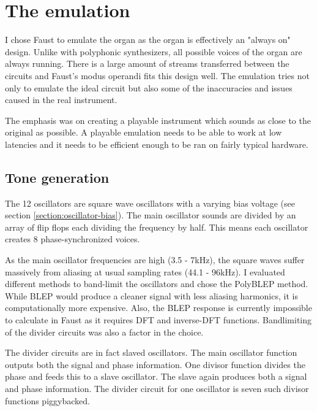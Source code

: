 \documentclass[11pt,a4paper]{article}
\begin{document}
\section{The emulation} 

I chose Faust to emulate the organ as the organ is effectively an "always on" design. Unlike with polyphonic synthesizers, all possible voices of the organ are always running. There is a large amount of streams transferred between the circuits and Faust's modus operandi fits this design well. The emulation tries not only to emulate the ideal circuit but also some of the inaccuracies and issues caused in the real instrument. 

The emphasis was on creating a playable instrument which sounds as close to the original as possible. A playable emulation needs to be able to work at low latencies and it needs to be efficient enough to be ran on fairly typical hardware.

\subsection{Tone generation}

The 12 oscillators are square wave oscillators with a varying bias voltage (see section \ref{section:oscillator-bias}). The main oscillator sounds are divided by an array of flip flops each dividing the frequency by half. This means each oscillator creates 8 phase-synchronized voices.

As the main oscillator frequencies are high (3.5 - 7kHz), the square waves suffer massively from aliasing at usual sampling rates (44.1 - 96kHz). I evaluated different methods to band-limit the oscillators and chose the PolyBLEP\cite{antialiasing} method. While BLEP would produce a cleaner signal with less aliasing harmonics, it is computationally more expensive. Also, the BLEP response is currently impossible to calculate in Faust as it requires DFT and inverse-DFT functions. Bandlimiting of the divider circuits was also a factor in the choice.

The divider circuits are in fact slaved oscillators. The main oscillator function outputs both the signal and phase information. One divisor function divides the phase and feeds this to a slave oscillator. The slave again produces both a signal and phase information. The divider circuit for one oscillator is seven such divisor functions piggybacked.
\end{document}
